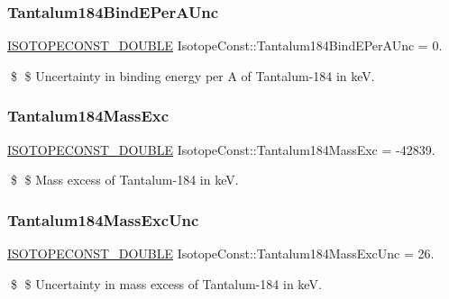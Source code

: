 \subsubsection{\texorpdfstring{Tantalum184\+Bind\+E\+Per\+A\+Unc}{Tantalum184BindEPerAUnc}}
{\footnotesize\ttfamily \mbox{\hyperlink{group___isotope_const-_macros_ga8f45a7272ce02c0b4c65c44636ed719a}{I\+S\+O\+T\+O\+P\+E\+C\+O\+N\+S\+T\+\_\+\+D\+O\+U\+B\+LE}} Isotope\+Const\+::\+Tantalum184\+Bind\+E\+Per\+A\+Unc = 0.}

\$ \$ Uncertainty in binding energy per A of Tantalum-\/184 in keV. \mbox{\label{group___isotope_const-_tantalum-_ta184_gacebfcbf0376583e919c7ac9852f3d413}} 
\subsubsection{\texorpdfstring{Tantalum184\+Mass\+Exc}{Tantalum184MassExc}}
{\footnotesize\ttfamily \mbox{\hyperlink{group___isotope_const-_macros_ga8f45a7272ce02c0b4c65c44636ed719a}{I\+S\+O\+T\+O\+P\+E\+C\+O\+N\+S\+T\+\_\+\+D\+O\+U\+B\+LE}} Isotope\+Const\+::\+Tantalum184\+Mass\+Exc = -\/42839.}

\$ \$ Mass excess of Tantalum-\/184 in keV. \mbox{\label{group___isotope_const-_tantalum-_ta184_gae1ff85e86de35df37e23a213f92d2e54}} 
\subsubsection{\texorpdfstring{Tantalum184\+Mass\+Exc\+Unc}{Tantalum184MassExcUnc}}
{\footnotesize\ttfamily \mbox{\hyperlink{group___isotope_const-_macros_ga8f45a7272ce02c0b4c65c44636ed719a}{I\+S\+O\+T\+O\+P\+E\+C\+O\+N\+S\+T\+\_\+\+D\+O\+U\+B\+LE}} Isotope\+Const\+::\+Tantalum184\+Mass\+Exc\+Unc = 26.}

\$ \$ Uncertainty in mass excess of Tantalum-\/184 in keV. \mbox{\label{group___isotope_const-_tantalum-_ta184_ga3a30e1bbd346075ca5eed5932dc0e684}} 
